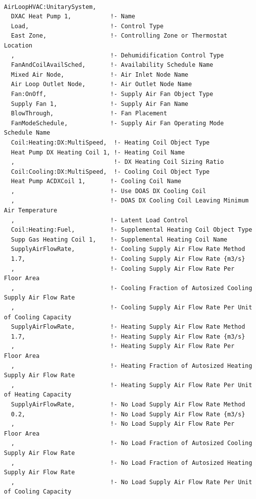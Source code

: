 \begin{lstlisting}

AirLoopHVAC:UnitarySystem,
  DXAC Heat Pump 1,           !- Name
  Load,                       !- Control Type
  East Zone,                  !- Controlling Zone or Thermostat Location
  ,                           !- Dehumidification Control Type
  FanAndCoilAvailSched,       !- Availability Schedule Name
  Mixed Air Node,             !- Air Inlet Node Name
  Air Loop Outlet Node,       !- Air Outlet Node Name
  Fan:OnOff,                  !- Supply Air Fan Object Type
  Supply Fan 1,               !- Supply Air Fan Name
  BlowThrough,                !- Fan Placement
  FanModeSchedule,            !- Supply Air Fan Operating Mode Schedule Name
  Coil:Heating:DX:MultiSpeed,  !- Heating Coil Object Type
  Heat Pump DX Heating Coil 1, !- Heating Coil Name
  ,                            !- DX Heating Coil Sizing Ratio
  Coil:Cooling:DX:MultiSpeed,  !- Cooling Coil Object Type
  Heat Pump ACDXCoil 1,       !- Cooling Coil Name
  ,                           !- Use DOAS DX Cooling Coil
  ,                           !- DOAS DX Cooling Coil Leaving Minimum Air Temperature
  ,                           !- Latent Load Control
  Coil:Heating:Fuel,          !- Supplemental Heating Coil Object Type
  Supp Gas Heating Coil 1,    !- Supplemental Heating Coil Name
  SupplyAirFlowRate,          !- Cooling Supply Air Flow Rate Method
  1.7,                        !- Cooling Supply Air Flow Rate {m3/s}
  ,                           !- Cooling Supply Air Flow Rate Per Floor Area
  ,                           !- Cooling Fraction of Autosized Cooling Supply Air Flow Rate
  ,                           !- Cooling Supply Air Flow Rate Per Unit of Cooling Capacity
  SupplyAirFlowRate,          !- Heating Supply Air Flow Rate Method
  1.7,                        !- Heating Supply Air Flow Rate {m3/s}
  ,                           !- Heating Supply Air Flow Rate Per Floor Area
  ,                           !- Heating Fraction of Autosized Heating Supply Air Flow Rate
  ,                           !- Heating Supply Air Flow Rate Per Unit of Heating Capacity
  SupplyAirFlowRate,          !- No Load Supply Air Flow Rate Method
  0.2,                        !- No Load Supply Air Flow Rate {m3/s}
  ,                           !- No Load Supply Air Flow Rate Per Floor Area
  ,                           !- No Load Fraction of Autosized Cooling Supply Air Flow Rate
  ,                           !- No Load Fraction of Autosized Heating Supply Air Flow Rate
  ,                           !- No Load Supply Air Flow Rate Per Unit of Cooling Capacity

\end{lstlisting}
